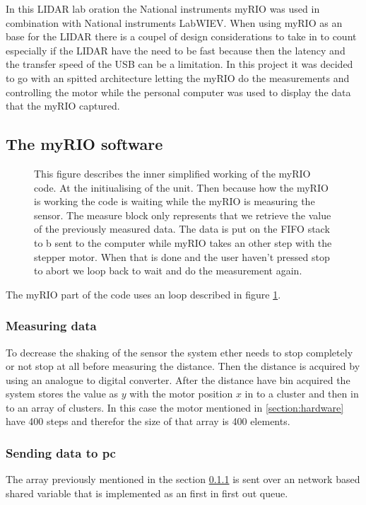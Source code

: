 In this LIDAR lab oration the National instruments myRIO was used in combination with National instruments LabWIEV. 
When using myRIO as an base for the LIDAR there is a coupel of design considerations to take in to count especially if the LIDAR have the need to be fast because then the latency and the transfer speed of the USB can be a limitation. 
In this project it was decided to go with an spitted architecture letting the myRIO do the measurements and controlling the motor while the personal computer was used to display the data that the myRIO captured.

\subsection{The myRIO software}\label{subsection:myRIO}
\begin{figure}[ht]
    
  \caption{This figure describes the inner simplified working of the myRIO code.
  At the initiualising of the unit. Then because how the myRIO is working the code is waiting while the myRIO is measuring the sensor. The measure block only represents that we retrieve the value of the previously measured data. The data is put on the FIFO stack to b sent to the computer while myRIO takes an other step with the stepper motor. When that is done and the user haven't pressed stop to abort we loop back to wait and do the measurement again.}
  \label{fig:myRIO-loop}
\end{figure}
The myRIO part of the code uses an loop described in figure \ref{fig:myRIO-loop}.

\subsubsection{Measuring data}\label{subsubsection:mesure}
To decrease the shaking of the sensor the system ether needs to stop completely or not stop at all before measuring the distance.
Then the distance is acquired by using an analogue to digital converter.
After the distance have bin acquired the system stores the value as $y$ with the motor position $x$ in to a cluster and then in to an array of clusters. In this case the motor mentioned in \ref{section:hardware} have 400 steps and therefor the size of that array is 400 elements.

\subsubsection{Sending data to pc}\label{subsubsection:sendData}
The array previously mentioned in the section \ref{subsubsection:mesure} is sent over an network based shared variable that is implemented as an first in first out queue\cite{myRIO-Shared}.


